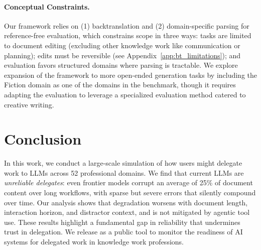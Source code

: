 \documentclass{article} %
\begin{document}
\vspace{-0.5\intextsep}
\paragraph{Conceptual Constraints.} Our framework relies on (1) backtranslation and (2) domain-specific parsing for reference-free evaluation, which constrains scope in three ways: tasks are limited to document editing (excluding other knowledge work like communication or planning); edits must be reversible (see Appendix~\ref{app:bt_limitations}); and evaluation favors structured domains where parsing is tractable. We explore expansion of the framework to more open-ended generation tasks by including the Fiction domain as one of the domains in the benchmark, though it requires adapting the evaluation to leverage a specialized evaluation method \citep{Chakrabarty2025AISlopTA} catered to creative writing.

\section{Conclusion} \label{sec:conclusion}


In this work, we conduct a large-scale simulation of how users might delegate work to LLMs across 52 professional domains. We find that current LLMs are \textit{unreliable delegates}: even frontier models corrupt an average of 25\% of document content over long workflows, with sparse but severe errors that silently compound over time. Our analysis shows that degradation worsens with document length, interaction horizon, and distractor context, and is not mitigated by agentic tool use. These results highlight a fundamental gap in reliability that undermines trust in delegation. We release \benchmark{} as a public tool to monitor the readiness of AI systems for delegated work in knowledge work professions.
\end{document}
